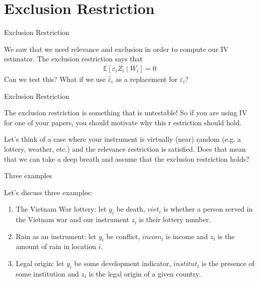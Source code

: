 \section{Exclusion Restriction}

\begin{frame}{Exclusion Restriction}

    We saw that we need relevance and exclusion in order to compute our IV estimator. The exclusion restriction says that
    \begin{align*}
        \mathbb{E}[\varepsilon_i Z_i \mid W_i] = 0
    \end{align*}
    Can we test this? What if we use $\hat{\varepsilon}_i$ as a replacement for $\varepsilon_i$?
    
\end{frame}

\begin{frame}{Exclusion Restriction}

    The exclusion restriction is something that is untestable! So if you are using IV for one of your papers, you should motivate why this r estriction should hold.
    
    \vspace{2em}
    
    Let's think of a case where your instrument is virtually (near) random (e.g. a lottery, weather, etc.) and the relevance restriction is satisfied. Does that mean that we can take a deep breath and assume that the exclusion restriction holds?
\end{frame}

\begin{frame}{Three examples}

    Let's discuss three examples:
    \begin{enumerate}
        \item The Vietnam War lottery: let $y_i$ be death, $viet_i$ is whether a person served in the Vietnam war and our instrument $z_i$ is their lottery number.
        \item Rain as an instrument: let $y_i$ be conflict, $incom_i$ is income and $z_i$ is the amount of rain in location $i$.
        \item Legal origin: let $y_i$ be some development indicator, $institut_i$ is the presence of some institution and $z_i$ is the legal origin of a given country.
    \end{enumerate}
\end{frame}

